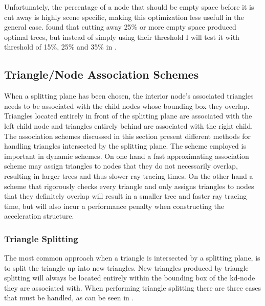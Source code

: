 Unfortunately, the percentage of a node that should be empty space before it is
cut away is highly scene specific, making this optimization less usefull in the
general case. \zhou{} found that cutting away 25\% or more empty space produced
optimal trees, but instead of simply using their threshold I will test it with
threshold of 15\%, 25\% and 35\% in .




\subsection{Triangle/Node Association Schemes}\label{sec:splittingSchemes}

When a splitting plane has been chosen, the interior node's associated triangles
needs to be associated with the child nodes whose bounding box they
overlap. Triangles located entirely in front of the splitting plane are
associated with the left child node and triangles entirely behind are associated
with the right child. The association schemes discussed in this section present
different methods for handling triangles intersected by the splitting plane. The
scheme employed is important in dynamic schemes. On one hand a fast
approximating association scheme may assign triangles to nodes that they do not
necessarily overlap, resulting in larger trees and thus slower ray tracing
times. On the other hand a scheme that rigorously checks every triangle and only
assigns triangles to nodes that they definitely overlap will result in a smaller
tree and faster ray tracing time, but will also incur a performance penalty when
constructing the acceleration structure.



\subsubsection{Triangle Splitting}


The most common approach when a triangle is intersected by a splitting plane, is
to split the triangle up into new triangles. New triangles produced by triangle
splitting will always be located entirely within the bounding box of the kd-node
they are associated with. When performing triangle splitting there are three
cases that must be handled, as can be seen in .

